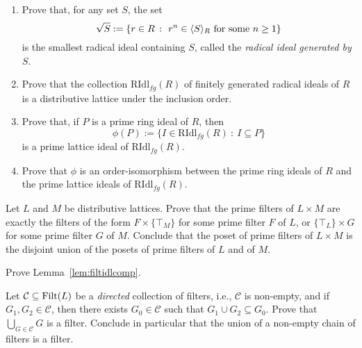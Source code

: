     
    \begin{enumerate}
      \item Prove that, for any set $S$, the set
      \[ \sqrt{S} := \{ r \in R \ \colon \ r^n \in \gen{S}_R \text{ for some } n \geq 1 \}\]
      is the smallest radical ideal containing $S$, called the \emph{radical ideal generated by $S$}.
      \item Prove that the collection $\mathrm{RIdl}_{fg}(R)$ of finitely generated radical ideals of $R$ is a distributive lattice under the inclusion order.
      \item Prove that, if $P$ is a prime ring ideal of $R$, then 
      \[ \phi(P) := \{ I \in \mathrm{RIdl}_{fg}(R) \ \colon \ I \subseteq P \} \]
      is a prime lattice ideal of $\mathrm{RIdl}_{fg}(R)$.
      \item Prove that $\phi$ is an order-isomorphism between the prime ring ideals of $R$ and the prime lattice ideals of $\mathrm{RIdl}_{fg}(R)$.
    \end{enumerate}

\exercise \label{exe:sumproductdualposet}
Let $L$ and $M$ be distributive lattices. Prove that the prime filters of $L \times M$ are exactly the filters of the form $F \times \{\top_M\}$ for some prime filter $F$ of $L$, or $\{\top_L\} \times G$ for some prime filter $G$ of $M$. Conclude that the poset of prime filters of $L \times M$ is the disjoint union of the posets of prime filters of $L$ and of $M$.

\begin{exercise}\label{exe:filtidlcomp}
Prove Lemma~\ref{lem:filtidlcomp}.
\end{exercise}

\begin{exercise}\label{exe:unionoffilters}
Let $\mathcal{C} \subseteq \mathrm{Filt}(L)$ be a \emph{directed} collection of filters, i.e., $\mathcal{C}$ is non-empty, and if $G_1, G_2 \in \mathcal{C}$, then there exists $G_0 \in \mathcal{C}$ such that $G_1 \cup G_2 \subseteq G_0$. Prove that $\bigcup_{G \in \mathcal{C}} G$ is a filter. Conclude in particular that the union of a non-empty chain of filters is a filter.
\end{exercise}


